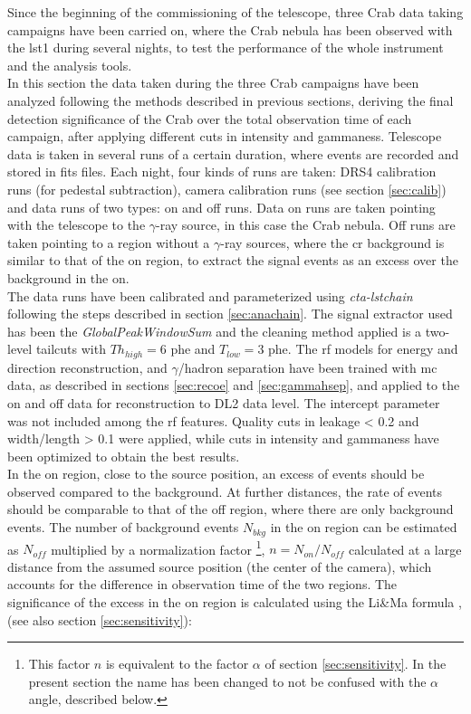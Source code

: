 \documentclass[main.tex]{subfiles}
\begin{document}
Since the beginning of the commissioning of the telescope, three Crab data taking campaigns have been carried on, where the Crab nebula has been observed with the \gls{lst}1 during several nights, to test the performance of the whole instrument and the analysis tools.\\
In this section the data taken during the three Crab campaigns have been analyzed following the methods described in previous sections, deriving the final detection significance of the Crab over the total observation time of each campaign, after applying different cuts in intensity and gammaness. Telescope data is taken in several runs of a certain duration, where events are recorded and stored in fits files. Each night, four kinds of runs are taken: DRS4 calibration runs (for pedestal subtraction), camera calibration runs (see section \ref{sec:calib}) and data runs of two types: on and off runs. Data on runs are taken pointing with the telescope to the $\gamma$-ray source, in this case the Crab nebula. Off runs are taken pointing to a region without a $\gamma$-ray sources, where the \gls{cr} background is similar to that of the on region, to extract the signal events as an excess over the background in the on.\\
The data runs have been calibrated and parameterized using \textit{cta-lstchain} following the steps described in section \ref{sec:anachain}. The signal extractor used has been the \textit{GlobalPeakWindowSum}  and the cleaning method applied is a two-level tailcuts with $Th_{high}=6$ phe and $T_{low}=3$ phe. The \gls{rf} models for energy and direction reconstruction, and $\gamma$/hadron separation have been trained with \gls{mc} data, as described in sections \ref{sec:recoe} and \ref{sec:gammahsep}, and applied to the on and off data for reconstruction to DL2 data level. The intercept parameter was not included among the \gls{rf} features. Quality cuts in leakage < 0.2 and width/length > 0.1 were applied, while cuts in intensity and gammaness have been optimized to obtain the best results.\\
In the on region, close to the source position, an excess of events should be observed compared to the background. At further distances, the rate of events should be comparable to that of the off region, where there are only background events. The number of background events $N_{bkg}$ in the on region can be estimated as $N_{off}$ multiplied by a normalization factor \footnote{This factor $n$ is equivalent to the factor $\alpha$ of section \ref{sec:sensitivity}. In the present section the name has been changed to not be confused with the $\alpha$ angle, described below.}, $n = N_{on}/N_{off}$ calculated at a large distance from the assumed source position (the center of the camera), which accounts for the difference in observation time of the two regions. The significance of the excess in the on region is calculated using the Li\&Ma formula \cite{1983LiMa}, \cite{2005LiMa} (see also section \ref{sec:sensitivity}):
\end{document}
